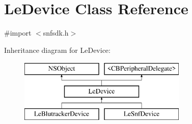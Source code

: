 \hypertarget{interface_le_device}{}\section{Le\+Device Class Reference}
\label{interface_le_device}


{\ttfamily \#import $<$snfsdk.\+h$>$}

Inheritance diagram for Le\+Device\+:\begin{figure}[H]
\begin{center}
\leavevmode
\includegraphics[height=3.000000cm]{interface_le_device}
\end{center}
\end{figure}
